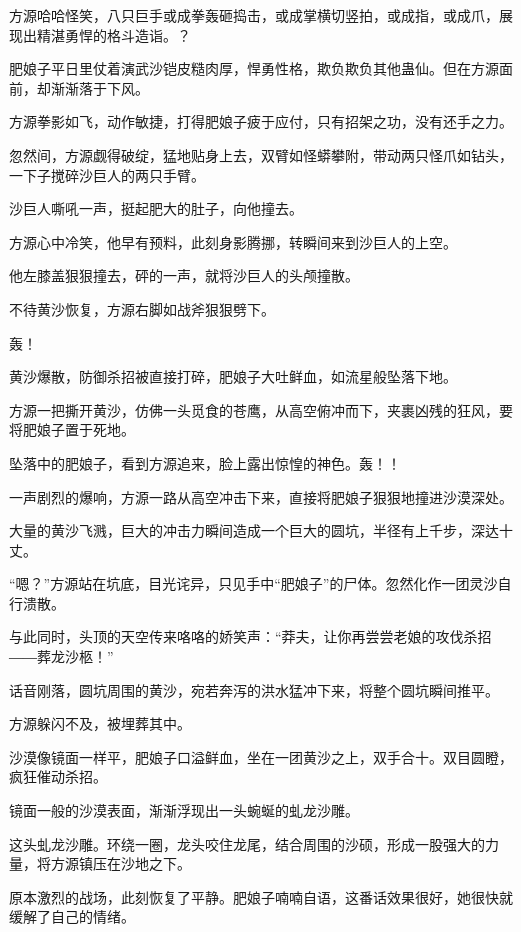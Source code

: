 
\begin{this_body}

方源哈哈怪笑，八只巨手或成拳轰砸捣击，或成掌横切竖拍，或成指，或成爪，展现出精湛勇悍的格斗造诣。？

肥娘子平日里仗着演武沙铠皮糙肉厚，悍勇性格，欺负欺负其他蛊仙。但在方源面前，却渐渐落于下风。

方源拳影如飞，动作敏捷，打得肥娘子疲于应付，只有招架之功，没有还手之力。

忽然间，方源觑得破绽，猛地贴身上去，双臂如怪蟒攀附，带动两只怪爪如钻头，一下子搅碎沙巨人的两只手臂。

沙巨人嘶吼一声，挺起肥大的肚子，向他撞去。

方源心中冷笑，他早有预料，此刻身影腾挪，转瞬间来到沙巨人的上空。

他左膝盖狠狠撞去，砰的一声，就将沙巨人的头颅撞散。

不待黄沙恢复，方源右脚如战斧狠狠劈下。

轰！

黄沙爆散，防御杀招被直接打碎，肥娘子大吐鲜血，如流星般坠落下地。

方源一把撕开黄沙，仿佛一头觅食的苍鹰，从高空俯冲而下，夹裹凶残的狂风，要将肥娘子置于死地。

坠落中的肥娘子，看到方源追来，脸上露出惊惶的神色。轰！！

一声剧烈的爆响，方源一路从高空冲击下来，直接将肥娘子狠狠地撞进沙漠深处。

大量的黄沙飞溅，巨大的冲击力瞬间造成一个巨大的圆坑，半径有上千步，深达十丈。

“嗯？”方源站在坑底，目光诧异，只见手中“肥娘子”的尸体。忽然化作一团灵沙自行溃散。

与此同时，头顶的天空传来咯咯的娇笑声：“莽夫，让你再尝尝老娘的攻伐杀招――葬龙沙柩！”

话音刚落，圆坑周围的黄沙，宛若奔泻的洪水猛冲下来，将整个圆坑瞬间推平。

方源躲闪不及，被埋葬其中。

沙漠像镜面一样平，肥娘子口溢鲜血，坐在一团黄沙之上，双手合十。双目圆瞪，疯狂催动杀招。

镜面一般的沙漠表面，渐渐浮现出一头蜿蜒的虬龙沙雕。

这头虬龙沙雕。环绕一圈，龙头咬住龙尾，结合周围的沙硕，形成一股强大的力量，将方源镇压在沙地之下。

原本激烈的战场，此刻恢复了平静。肥娘子喃喃自语，这番话效果很好，她很快就缓解了自己的情绪。


\end{this_body}
